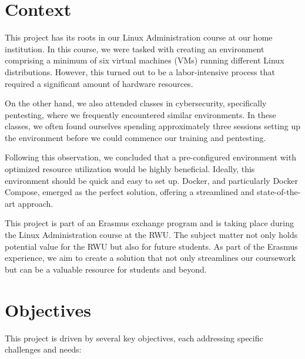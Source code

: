 \documentclass[a4paper,11pt,singlespacing]{article}
\begin{document}
\section{Context}
This project has its roots in our Linux Administration course at our home institution. In this course, we were tasked with creating an environment comprising a minimum of six virtual machines (VMs) running different Linux distributions. However, this turned out to be a labor-intensive process that required a significant amount of hardware resources.\par
On the other hand, we also attended classes in cybersecurity, specifically pentesting, where we frequently encountered similar environments. In these classes, we often found ourselves spending approximately three sessions setting up the environment before we could commence our training and pentesting.\par
Following this observation, we concluded that a pre-configured environment with optimized resource utilization would be highly beneficial. Ideally, this environment should be quick and easy to set up. Docker, and particularly Docker Compose, emerged as the perfect solution, offering a streamlined and state-of-the-art approach.\par
This project is part of an Erasmus exchange program and is taking place during the Linux Administration course at the RWU. The subject matter not only holds potential value for the RWU but also for future students. As part of the Erasmus experience, we aim to create a solution that not only streamlines our coursework but can be a valuable resource for students and beyond.\par



\section{Objectives}
This project is driven by several key objectives, each addressing specific challenges and needs:
\end{document}
